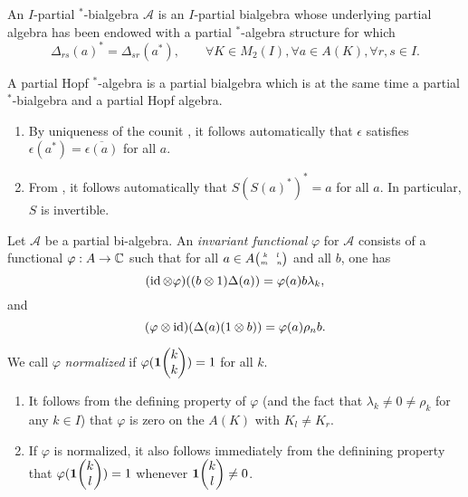 \begin{Def} An $I$-partial $^*$-bialgebra $\mathscr{A}$ is an $I$-partial bialgebra whose underlying partial algebra has been endowed with a partial $^*$-algebra structure for which \[\Delta_{rs}(a)^* = \Delta_{sr}(a^*),\qquad \forall K\in M_2(I), \forall a\in A(K), \forall r,s\in I.\]

A partial Hopf $^*$-algebra is a partial bialgebra which is at the same time a partial $^*$-bialgebra and a partial Hopf algebra.
\end{Def} 

\begin{Rem}
\begin{enumerate}
\item By uniqueness of the counit \cite[Theorem 2.8]{Boh1}, it follows automatically that $\epsilon$ satisfies $\epsilon(a^*) = \overline{\epsilon(a)}$ for all $a$.
\item From \cite[Proposition 4.11]{VDW1}, it follows automatically that $S(S(a)^*)^* = a$ for all $a$. In particular, $S$ is invertible. %
\end{enumerate}
\end{Rem}

\begin{Def} Let $\mathscr{A}$ be a partial bi-algebra. An \emph{invariant functional} $\varphi$ for $\mathscr{A}$ consists of a functional $\varphi:A\rightarrow \mathbb{C}$ %
such that for all $a\in A{{\tiny \begin{pmatrix} k \quad l \\ m \quad n\end{pmatrix}}}$ and all $b$, one has  \[(\operatorname{id}\otimes \varphi)((b\otimes 1)\Delta(a)) = \varphi(a)b\lambda_k,\] and \[(\varphi\otimes \operatorname{id})(\Delta(a)(1\otimes b)) = \varphi(a)\rho_nb.\]

We call $\varphi$ \emph{normalized} if $\varphi(\mathbf{1}\!\begin{pmatrix} k \\ k\end{pmatrix}) = 1$ for all $k$. 
\end{Def} %

\begin{Rem} 
\begin{enumerate}
\item It follows from the defining property of $\varphi$ (and the fact that $\lambda_k\neq 0\neq \rho_k$ for any $k\in I$) that $\varphi$ is zero on the $A(K)$ with $K_l\neq K_r$. 
\item If $\varphi$ is normalized, it also follows immediately from the definining property that $\varphi(\mathbf{1}\!\begin{pmatrix} k \\ l\end{pmatrix})=1$ whenever $\mathbf{1}\!\begin{pmatrix} k \\ l\end{pmatrix}\neq 0$.
\end{enumerate}
\end{Rem} 

